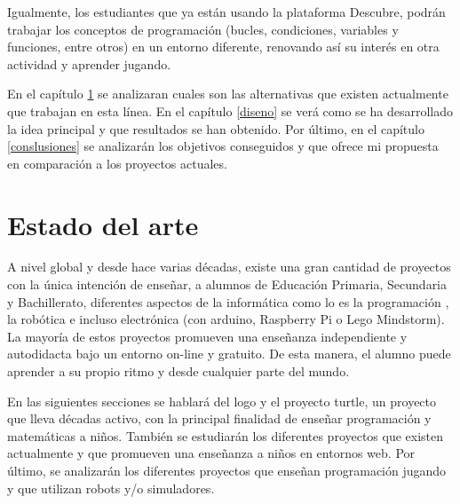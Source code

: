 Igualmente, los estudiantes que ya están usando la plataforma Descubre, podrán trabajar los conceptos de programación (bucles, condiciones, variables y funciones, entre otros) en un entorno diferente, renovando así su interés en otra actividad y aprender jugando.




En el capítulo \ref{estado-arte} se analizaran cuales son las alternativas que existen actualmente que trabajan en esta línea. En el capítulo \ref{diseno} se verá como se ha desarrollado la idea principal y que resultados se han obtenido. Por último, en el capítulo \ref{conslusiones} se analizarán los objetivos conseguidos y que ofrece mi propuesta en comparación a los proyectos actuales.



\chapter{Estado del arte}\label{estado-arte}



A nivel global y desde hace varias décadas, existe una gran cantidad de proyectos con la única intención de enseñar, a alumnos de Educación Primaria, Secundaria y Bachillerato, diferentes aspectos de la informática como lo es la programación \cite{code-school,code-org,code-academy}, la robótica \cite{robomind-web,moway} e incluso electrónica (con \Gls{arduino}\cite{arduino}, Raspberry Pi\cite{raspberry-pi} o Lego Mindstorm\cite{lego-mindstorm-programar}).
La mayoría de estos proyectos promueven una enseñanza independiente y autodidacta bajo un entorno on-line y gratuito. De esta manera, el alumno puede aprender a su propio ritmo y desde cualquier parte del mundo.

En las siguientes secciones se hablará del \Gls{logo}\cite{logo} y el proyecto \Gls{turtle}\cite{logo-turtle}, un proyecto que lleva décadas activo, con la principal finalidad de enseñar programación y matemáticas a niños. También se estudiarán los diferentes proyectos que existen actualmente y que promueven una enseñanza a niños en entornos web. Por último, se analizarán los diferentes proyectos que enseñan programación jugando y que utilizan robots y/o simuladores.


